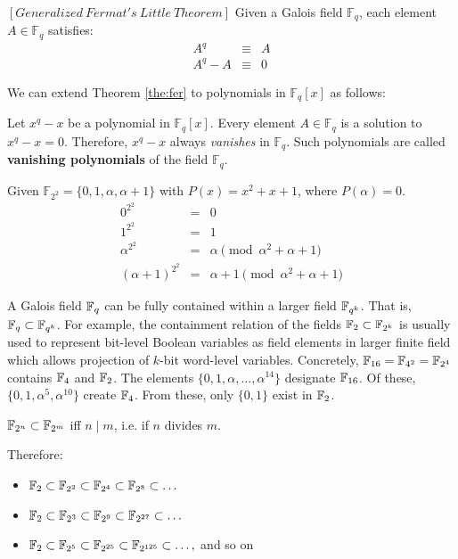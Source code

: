 \begin{Theorem}\label{the:fer}
 $\left[Generalized\  Fermat's\  Little\  Theorem \right]$ Given a
 Galois field $\mathbb{F}_{q}$, each element $A \in \mathbb{F}_{q}$ satisfies: 
\begin{eqnarray}\label{fe}
 A^{q} & \equiv & A  \nonumber \\
 A^{q} - A & \equiv& 0  
\end{eqnarray}
\end{Theorem} 

We can extend Theorem \ref{the:fer} to polynomials in $\mathbb{F}_{q}[x]$ as 
follows: 
\begin{Definition}
Let $x^q-x$ be a polynomial in $\mathbb{F}_{q}[x]$.
Every element $A \in \mathbb{F}_{q}$ is a solution to  $x^q-x=0$. 
Therefore, $x^{q} - x$ always {\it vanishes} in $\mathbb{F}_{q}$. Such 
polynomials are called {\bf vanishing polynomials} of the field $\mathbb{F}_{q}$.
\end{Definition}

\begin{Example}
Given $\mathbb{F}_{2^2} =\{0,1,\alpha,\alpha+1\}$ with $P(x)=x^2+x+1$, where $P(\alpha)=0$. 
 \begin{eqnarray}
 0^{2^2}&=&0 \nonumber \\
 1^{2^2}&=&1 \nonumber \\
 \alpha^{2^2}&=&\alpha \pmod {\alpha^2+\alpha+1}\nonumber \\
 (\alpha+1)^{2^2}&=&\alpha+1 \pmod {\alpha^2+\alpha+1} \nonumber 
 \end{eqnarray}
\end{Example}

A Galois field ${\mathbb{F}}_q$ can be fully contained within a larger field ${\mathbb{F}}_{q^k}$.
That is, ${\mathbb{F}}_q \subset {\mathbb{F}}_{q^k}$.
For example, the containment relation of the fields 
${\mathbb{F}}_2 \subset {\mathbb{F}}_{2^k}$ is usually used to represent bit-level Boolean variables as field elements
in larger finite field which allows projection of $k$-bit word-level variables. 
Concretely, ${\mathbb{F}}_{16}={\mathbb{F}}_{4^2}={\mathbb{F}}_{2^4}$ contains ${\mathbb{F}}_4$ and ${\mathbb{F}}_2$.
The elements $\{0,1,\alpha,\dots,\alpha^{14}\}$
designate ${\mathbb{F}}_{16}$. Of these, $\{0,1,\alpha^5,\alpha^{10}\}$ create ${\mathbb{F}}_4$.
From these, only $\{0,1\}$ exist in ${\mathbb{F}}_2$.

\begin{Theorem}
${\mathbb{F}}_{2^n}\subset{\mathbb{F}}_{2^m}$ iff $n \mid m$, i.e. if $n$ divides $m$.
\end{Theorem}

Therefore:
\begin{itemize}
\item ${\mathbb{F}}_2 \subset {\mathbb{F}}_{2^2} \subset {\mathbb{F}}_{2^4} \subset {\mathbb{F}}_{2^8} \subset \dots$
\item ${\mathbb{F}}_2 \subset {\mathbb{F}}_{2^3} \subset {\mathbb{F}}_{2^9} \subset {\mathbb{F}}_{2^{27}} \subset \dots$
\item ${\mathbb{F}}_2 \subset {\mathbb{F}}_{2^5} \subset {\mathbb{F}}_{2^{25}} \subset {\mathbb{F}}_{2^{125}} \subset \dots,$ and so on
\end{itemize}

